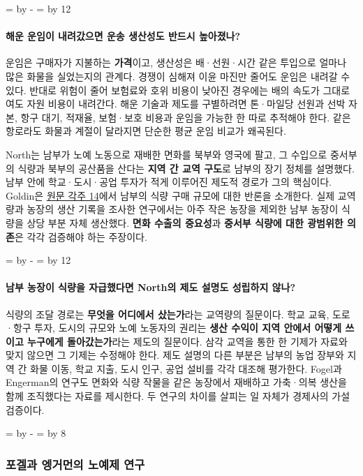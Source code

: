\documentclass[10pt,a4paper]{article}
\newcommand{\ReserveQuestionSpace}{%
  \par\begingroup
  \dimen0=\pagegoal \advance\dimen0 by -\pagetotal
  \dimen2=\baselineskip \multiply\dimen2 by 12
  \ifdim\dimen0<\dimen2 \newpage\fi
  \endgroup}
\newcommand{\ReserveReadingSectionSpace}{%
  \par\begingroup
  \dimen0=\pagegoal \advance\dimen0 by -\pagetotal
  \dimen2=\baselineskip \multiply\dimen2 by 8
  \ifdim\dimen0<\dimen2 \newpage\fi
  \endgroup}
\begin{document}
\ReserveQuestionSpace
\paragraph{해운 운임이 내려갔으면 운송 생산성도 반드시 높아졌나?}
운임은 구매자가 지불하는 \textbf{가격}이고, 생산성은 배·선원·시간 같은 투입으로 얼마나 많은 화물을 실었는지의 관계다. 경쟁이 심해져 이윤 마진만 줄어도 운임은 내려갈 수 있다. 반대로 위험이 줄어 보험료와 호위 비용이 낮아진 경우에는 배의 속도가 그대로여도 자원 비용이 내려간다. 해운 기술과 제도를 구별하려면 톤·마일당 선원과 선박 자본, 항구 대기, 적재율, 보험·보호 비용과 운임을 가능한 한 따로 추적해야 한다. 같은 항로라도 화물과 계절이 달라지면 단순한 평균 운임 비교가 왜곡된다.\par

North는 남부가 노예 노동으로 재배한 면화를 북부와 영국에 팔고, 그 수입으로 중서부의 식량과 북부의 공산품을 산다는 \textbf{지역 간 교역 구도}로 남부의 장기 정체를 설명했다. 남부 안에 학교·도시·공업 투자가 적게 이루어진 제도적 경로가 그의 핵심이다. Goldin은 \href{https://goldin.scholars.harvard.edu/sites/g/files/omnuum5966/files/goldin/files/cliometrics.pdf}{원문 각주 14}에서 남부의 식량 구매 규모에 대한 반론을 소개한다. 실제 교역량과 농장의 생산 기록을 조사한 연구에서는 아주 작은 농장을 제외한 남부 농장이 식량을 상당 부분 자체 생산했다. \textbf{면화 수출의 중요성}과 \textbf{중서부 식량에 대한 광범위한 의존}은 각각 검증해야 하는 주장이다.\par

\ReserveQuestionSpace
\paragraph{남부 농장이 식량을 자급했다면 North의 제도 설명도 성립하지 않나?}
식량의 조달 경로는 \textbf{무엇을 어디에서 샀는가}라는 교역량의 질문이다. 학교 교육, 도로·항구 투자, 도시의 규모와 노예 노동자의 권리는 \textbf{생산 수익이 지역 안에서 어떻게 쓰이고 누구에게 돌아갔는가}라는 제도의 질문이다. 삼각 교역을 통한 한 기제가 자료와 맞지 않으면 그 기제는 수정해야 한다. 제도 설명의 다른 부분은 남부의 농업 장부와 지역 간 화물 이동, 학교 지출, 도시 인구, 공업 설비를 각각 대조해 평가한다. Fogel과 Engerman의 연구도 면화와 식량 작물을 같은 농장에서 재배하고 가축·의복 생산을 함께 조직했다는 자료를 제시한다. 두 연구의 차이를 살피는 일 자체가 경제사의 가설 검증이다.\par

\ReserveReadingSectionSpace
\subsubsection*{포겔과 엥거먼의 노예제 연구}
\end{document}
